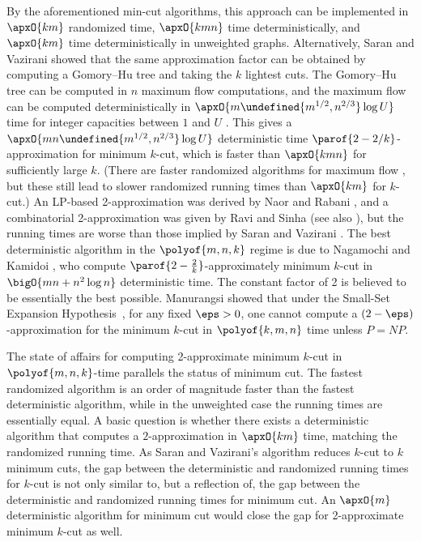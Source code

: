 \documentclass{toc}
\let\minof\undefined\usepackage{math} %
\begin{document}
By the aforementioned min-cut algorithms, this approach can be
implemented in $\apxO{k m}$ randomized time, $\apxO{k m n}$ time
deterministically, and $\apxO{k m}$ time deterministically in
unweighted graphs. Alternatively, Saran and Vazirani \cite{sv-95}
showed that the same approximation factor can be obtained by computing
a Gomory--Hu tree and taking the $k$ lightest cuts. The Gomory--Hu
tree can be computed in $n$ maximum flow computations, and the maximum
flow can be computed deterministically in
\begin{math}
  \apxO{m \minof{m^{1/2}, n^{2/3}} \log U}
\end{math}
time for integer capacities between $1$ and $U$ \cite{gr-98}. This
gives a $\apxO{m n \minof{m^{1/2}, n^{2/3}} \log U}$ deterministic time
$\parof{2 - 2/k}$-approximation for minimum $k$-cut, which is faster
than $\apxO{k m n}$ for sufficiently large $k$. (There are faster
randomized algorithms for maximum flow \cite{ls-14,madry-16}, but
these still lead to slower randomized running times than $\apxO{k m}$
for $k$-cut.) An %
LP-based  %
2-approximation was derived by Naor and
Rabani \cite{nr-01}, and a combinatorial 2-approximation was given by
Ravi and Sinha \cite{rs-08} (see also \cite{barahona-00}), but the
running times are worse than those implied by Saran and Vazirani
\cite{sv-95}. The best deterministic algorithm in the
%
$\polyof{m,n,k}$ %
regime is due to Nagamochi and Kamidoi \cite{nk}, who compute
$\parof{2 - \frac{2}{k}}$-approximately minimum
%
$k$-cut in   %
$\bigO{m n + n^2 \log n}$ deterministic time. The constant factor of 2
is believed to be essentially the best possible.  Manurangsi
\cite{manurangsi-17} showed that under the
%
Small-Set Expansion Hypothesis~\cite{RS10}, %
%
%
for any fixed $\eps > 0$, one cannot compute a
$(2-\eps)$-approximation for the minimum $k$-cut in $\polyof{k,m,n}$
time unless $P = NP$.

The state of affairs for computing 2-approximate minimum
     $k$-cut  %
in $\polyof{m,n,k}$-time parallels the status of minimum cut. The fastest
randomized algorithm is an order of magnitude faster than the fastest
deterministic algorithm, while in the unweighted case the running
times are essentially equal. A basic question is whether there exists
a deterministic algorithm that computes a $2$-approximation in
$\apxO{k m}$ time, matching the randomized running time. As
Saran and Vazirani's algorithm reduces $k$-cut to $k$ minimum cuts,
the gap between the deterministic and randomized running times for
$k$-cut is not only similar to, but a reflection of, the gap between
the deterministic and randomized running times for minimum cut. An
$\apxO{m}$ deterministic algorithm for minimum cut would close the gap
for 2-approximate
minimum  %
$k$-cut as well.
\end{document}
